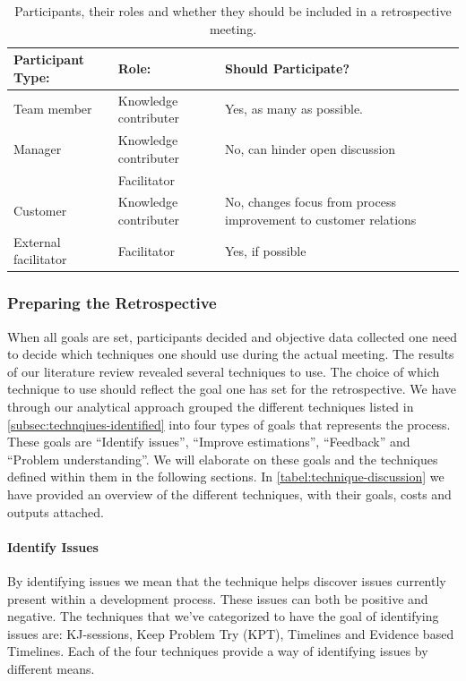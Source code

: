 \documentclass[12pt]{article}
\begin{document}
\begin{table}[!h]
	\centering
	\captionsetup{justification=centering}
	\caption{Participants, their roles and whether they should be included in a retrospective meeting.}
	\label{table:participants}
	\begin{tabular}{llp{}}
		\hline
		Participant Type: & Role: & Should Participate?\\ \hline
		Team member & Knowledge contributer & Yes, as many as possible. \\
		Manager & Knowledge contributer & No, can hinder open discussion \\
		& Facilitator & \\ 
		Customer & Knowledge contributer & No, changes focus from process improvement to customer relations \\
		External facilitator & Facilitator & Yes, if possible \\ 
		\hline
	\end{tabular}
\end{table}

\subsubsection{Preparing the Retrospective} \label{subsec:which-techniques}
When all goals are set, participants decided and objective data collected one need to decide which techniques one should use during the actual meeting. The results of our literature review revealed several techniques to use. The choice of which technique to use should reflect the goal one has set for the retrospective. We have through our analytical approach grouped the different techniques listed in \autoref{subsec:technqiues-identified} into four types of goals that represents the process. These goals are ``Identify issues'', ``Improve estimations'', ``Feedback'' and ``Problem understanding''. We will elaborate on these goals and the techniques defined within them in the following sections. In \autoref{tabel:technique-discussion} we have provided an overview of the different techniques, with their goals, costs and outputs attached. 

\paragraph{Identify Issues}
By identifying issues we mean that the technique helps discover issues currently present within a development process. These issues can both be positive and negative. The techniques that we've categorized to have the goal of identifying issues are: KJ-sessions, Keep Problem Try (KPT), Timelines and Evidence based Timelines. Each of the four techniques provide a way of identifying issues by different means.
\end{document}
